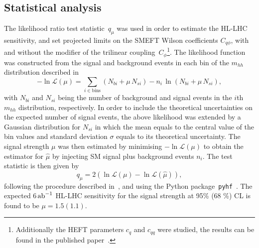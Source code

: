 \subsection{Statistical analysis}
\par The likelihood ratio test statistic~$q_\mu$ was used  in order to estimate the HL-LHC sensitivity, and set projected limits on the SMEFT Wilson coefficients $C_{q\phi}$, with and without the modifier of the trilinear coupling~$C_\phi$\footnote{ Additionally the HEFT parameters $c_q$ and $c_{qq}$ were studied, the results can be found in the published paper~\cite{Alasfar:2019pmn}.}. The likelihood function was constructed from the signal and background events in each bin of the $m_{hh}$ distribution described in ~\cite{Azatov:2015oxa} 
\begin{equation} \label{loglik}
	- \ln \mathscr L (\mu) = \sum_{i \in \mathrm{bins}} (N_{bi} + \mu\, N_{si}) - n_i\, \ln(N_{bi} + \mu\, N_{si}),
\end{equation}
with  $N_{bi}$ and $N_{si}$ being the number of background  and signal events in the $i$th $ m_{hh}$ distribution, respectively. In order to include the theoretical uncertainties on the expected number of signal events, the above likelihood was extended by a Gaussian distribution for $N_{si}$ in which the mean equals to the central value of the bin values and standard deviation $\sigma$ equals to its theoretical uncertainty.
The signal strength $ \mu$ was then estimated by minimising $- \ln \mathscr L (\mu)$ to obtain the estimator for $\hat \mu$ by injecting SM signal plus background events $n_i$. The test statistic is then given by
\begin{equation}
	q_\mu = 2 (\ln \mathscr L (\mu)- \ln \mathscr L ( \hat \mu) ),
\end{equation}
following the procedure described in~\cite{Cowan:2010js}, and using the Python package~\texttt{pyhf}~\cite{pyhf,pyhf_joss}.
The expected  6$\,{\rm ab}^{-1}$ HL-LHC sensitivity for the signal strength  at 95\% (68 \%) CL is found to be $\mu  = 1.5 (1.1)$.
